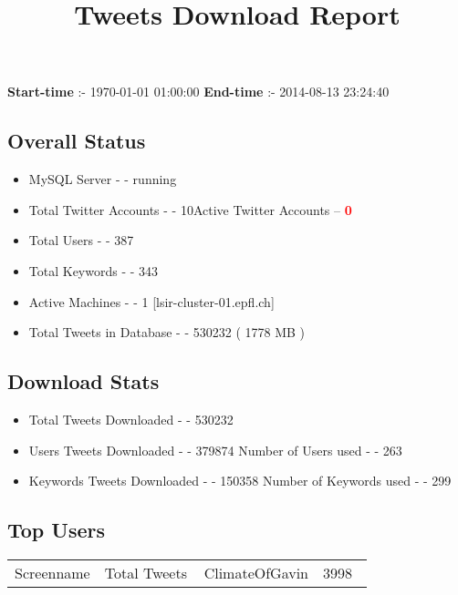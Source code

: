 \documentclass{article}\usepackage[T1]{fontenc}
\begin{document}
\title{\textbf{Tweets Download Report}}
               \date{}
                \maketitle
               \centerline{\textbf{Start-time} :- 1970-01-01 01:00:00 \hspace{40pt} \textbf{End-time} :- 2014-08-13 23:24:40}               \subsection*{Overall Status}                \begin{itemize}                \item MySQL Server - - running               \item Total Twitter Accounts - - 10\newline Active Twitter Accounts -- \textcolor{red}{\textbf{0}}               \item Total Users - - 387               \item Total Keywords - - 343               \item Active Machines - - 1 [lsir-cluster-01.epfl.ch]               \item Total Tweets in Database - - 530232 ( 1778 MB )               \end{itemize}               \subsection*{Download Stats}                \begin{itemize}                \item Total Tweets Downloaded - - 530232               \item Users Tweets Downloaded - - 379874 \newline Number of Users used - - 263               \item Keywords Tweets Downloaded - - 150358 \newline Number of Keywords used - - 299              \end{itemize}              \subsection*{Top Users}\begin{center}         \begin{tabular}{|c|c|}         \hline         Screenname & Total Tweets \ 
 \hline
ClimateOfGavin & 3998\ 

\end{tabular}
\end{center}
\end{document}
